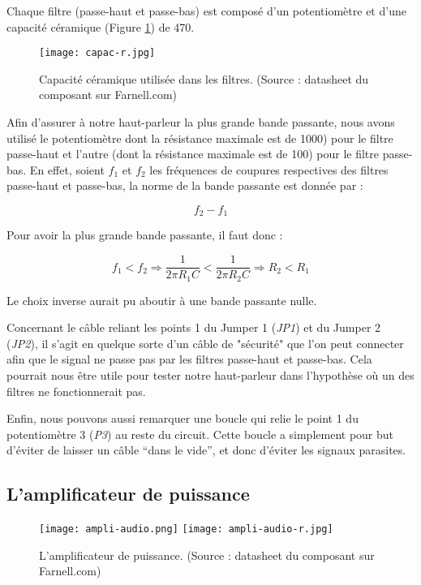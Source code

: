 Chaque filtre (passe-haut et passe-bas) est composé d'un potentiomètre et d'une capacité céramique
(Figure \ref{capac-r}) de \unit{470}{\nano\farad}.

\begin{figure}[!htb]
	\centering
	\texttt{[image: capac-r.jpg]}
	\caption{Capacité céramique utilisée dans les filtres. (Source : datasheet du composant sur Farnell.com)}
	\label{capac-r}
\end{figure}

Afin d'assurer à notre haut-parleur la plus grande bande passante, nous avons utilisé le potentiomètre
dont la résistance maximale est de \unit{1000}{\ohm}) pour le filtre passe-haut et
l'autre (dont la résistance maximale est de \unit{100}{\ohm}) pour le filtre passe-bas. En effet, soient
$f_1$ et $f_2$ les fréquences de coupures respectives des filtres passe-haut et passe-bas, la norme de la 
bande passante est donnée par :

$$f_2 - f_1$$

Pour avoir la plus grande bande passante, il faut donc :

$$f_1 < f_2 \Rightarrow \frac{1}{2\pi R_1C} < \frac{1}{2\pi R_2C} \Rightarrow R_2 < R_1$$

Le choix inverse aurait pu aboutir à une bande passante nulle.

Concernant le câble reliant les points 1 du Jumper 1 (\textit{JP1}) et du Jumper 2 (\textit{JP2}), 
il s'agit en quelque sorte d'un câble de "sécurité" que l'on peut connecter afin que le signal 
ne passe pas par les filtres passe-haut et passe-bas. 
Cela pourrait nous être utile pour tester notre haut-parleur dans l'hypothèse où un des filtres 
ne fonctionnerait pas.

Enfin, nous pouvons aussi remarquer une boucle qui relie le point 1 du potentiomètre 3 (\textit{P3})
au reste du circuit. Cette boucle a simplement pour but d'éviter de laisser un câble "`dans le vide"',
et donc d'éviter les signaux parasites.

\subsection{L'amplificateur de puissance}

\begin{figure}[!htb]
	\centering
	\texttt{[image: ampli-audio.png]}
	\texttt{[image: ampli-audio-r.jpg]}
	\caption{L'amplificateur de puissance. (Source : datasheet du composant sur Farnell.com)}
	\label{ampli-audio}
\end{figure}

